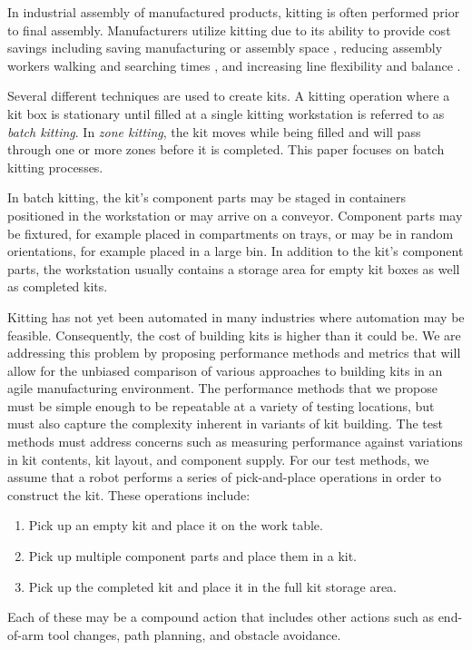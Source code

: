 In industrial assembly of manufactured products, kitting is
often performed prior to final assembly. Manufacturers utilize kitting
due to its ability to provide cost savings \cite{Carlsson_2008}
including saving manufacturing or assembly space \cite{Medbo2003},
reducing assembly workers walking and searching times \cite{Schwind1992},
and increasing line flexibility \cite{Bozer1992} and balance \cite{Jiao2000}.

Several different techniques are used to create kits. A kitting
operation where a kit box is stationary until filled at a single
kitting workstation is referred to as {\it batch kitting}.
In {\it zone kitting}, the kit moves while being filled and will pass through one or
more zones before it is completed. This paper focuses on batch kitting processes.

In batch kitting, the kit's component parts may be staged in
containers positioned in the workstation or may arrive on a conveyor.
Component parts may be fixtured, for example placed in compartments
on trays, or may be in random orientations, for example
placed in a large bin. In addition to the kit's component parts,
the workstation usually contains a storage area for empty kit boxes as
well as completed kits.

Kitting has not yet been automated in many industries where
automation may be feasible. Consequently, the cost of building
kits is higher than it could be. We are addressing this problem
by proposing performance methods and metrics that will allow for
the unbiased comparison of various approaches to building kits
in an agile manufacturing environment. The performance methods
that we propose must be simple enough to be repeatable at a variety of
testing locations, but must also capture the complexity inherent
in variants of kit building. The test methods must address concerns such as
measuring performance against variations in kit contents, kit
layout, and component supply. For our test methods, we assume that
a robot performs a series of pick-and-place operations
in order to construct the kit. These operations include:
\begin{enumerate}
\item Pick up an empty kit and place it on the work table.
\item Pick up multiple component parts and place them in a kit.
\item Pick up the completed kit and place it in the full kit storage area.
\end{enumerate}
Each of these may be a compound action that includes
other actions such as end-of-arm tool changes, path planning,
and obstacle avoidance.


